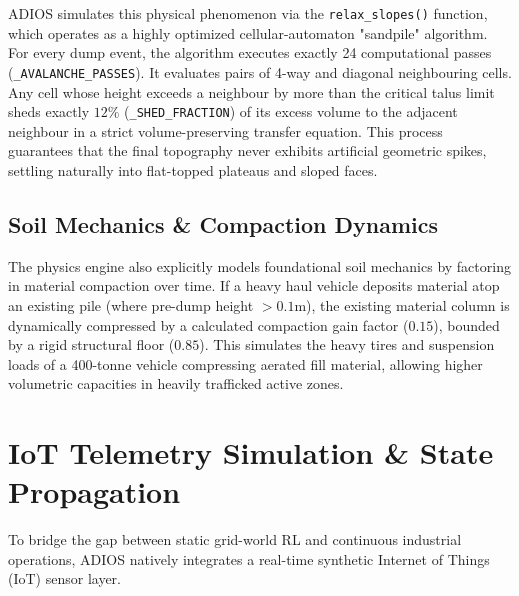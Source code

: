 \documentclass[conference]{IEEEtran}
\begin{document}
ADIOS simulates this physical phenomenon via the \texttt{relax\_slopes()} function, which operates as a highly optimized cellular-automaton "sandpile" algorithm. For every dump event, the algorithm executes exactly 24 computational passes (\texttt{\_AVALANCHE\_PASSES}). It evaluates pairs of 4-way and diagonal neighbouring cells. Any cell whose height exceeds a neighbour by more than the critical talus limit sheds exactly $12\%$ (\texttt{\_SHED\_FRACTION}) of its excess volume to the adjacent neighbour in a strict volume-preserving transfer equation. This process guarantees that the final topography never exhibits artificial geometric spikes, settling naturally into flat-topped plateaus and sloped faces.

\subsection{Soil Mechanics \& Compaction Dynamics}
The physics engine also explicitly models foundational soil mechanics by factoring in material compaction over time. If a heavy haul vehicle deposits material atop an existing pile (where pre-dump height $>0.1\text{m}$), the existing material column is dynamically compressed by a calculated compaction gain factor ($0.15$), bounded by a rigid structural floor ($0.85$). This simulates the heavy tires and suspension loads of a 400-tonne vehicle compressing aerated fill material, allowing higher volumetric capacities in heavily trafficked active zones.

\section{IoT Telemetry Simulation \& State Propagation}

To bridge the gap between static grid-world RL and continuous industrial operations, ADIOS natively integrates a real-time synthetic Internet of Things (IoT) sensor layer.
\end{document}
